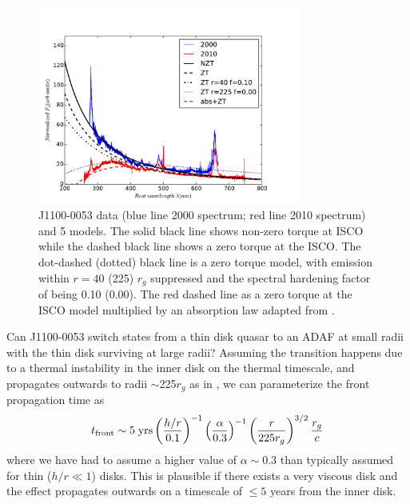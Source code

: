 \documentclass[a4paper,fleqn,usenatbib]{mnras}
\begin{document}
\begin{figure}
  \centering
  \includegraphics[width=8.7cm, trim=0.2cm 0.2cm 1.4cm 0.6cm, clip]
  {../plots/models/mcd_gap_v3_4_b1.pdf}
  \vspace{-12pt}
  \caption[]{
    J1100-0053 data (blue line 2000 spectrum; red line 2010 spectrum) and
    5 models. The solid black line shows non-zero torque at ISCO
    \citep[following][]{Afshordi_Paczynski2003} while the
    dashed black line shows a zero torque at the ISCO. 
    The dot-dashed  (dotted) black line is a zero torque model, with emission
    within $r=40$ (225) $r_{g}$ suppressed and the spectral hardening factor of
  \citet{Zimmerman2005} being 0.10 (0.00). 
The red dashed line as a zero
  torque at the ISCO model multiplied by an absorption law adapted from
  \citep{Guo2016}.
}
  \label{fig:disk_suppression}
\end{figure}
Can J1100-0053 switch states from a thin disk quasar to an ADAF at
small radii with the thin disk surviving at large radii?  Assuming the
transition happens due to a thermal instability in the inner disk on
the thermal timescale, and propagates outwards to radii
$\sim$225$r_{g}$ as in \citet{Nemmen2006}, we can parameterize the
front propagation time as
\begin{equation}
    t_{\rm front}  \sim  5 \; {\rm yrs} \left(\frac{h/r}{0.1}\right)^{-1}
                                                           \left(\frac{\alpha}{0.3}\right)^{-1}  
                                                           \left(\frac{r}{225r_{g}}\right)^{3/2}  
                                                           \frac{r_{g}}{c}
\label{eqn:t_front}
\end{equation}
where we have had to assume a higher value of $\alpha \sim 0.3$
\citep{King2007} than typically assumed for thin ($h/r \ll 1$)
disks. This is plausible if there exists a very viscous disk and the
effect propagates outwards on a timescale of $\leq 5$ years from the
inner disk.
\end{document}
